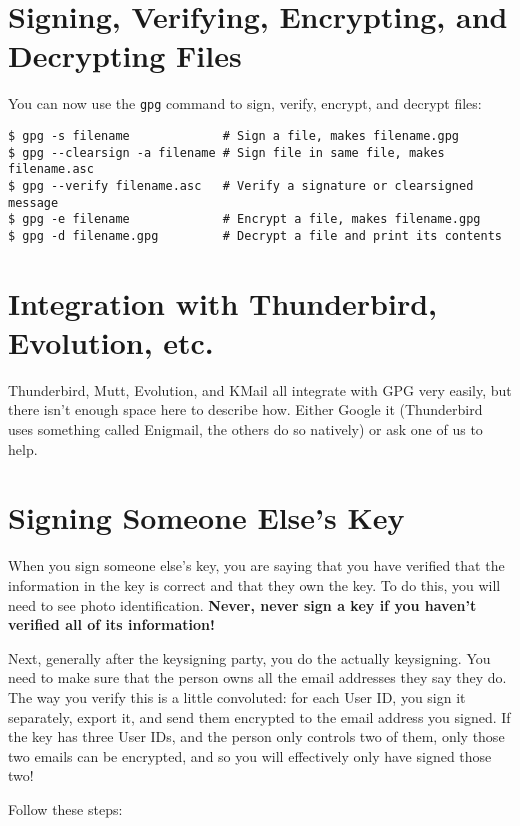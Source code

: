 \documentclass{article}
\begin{document}
\section*{Signing, Verifying, Encrypting, and Decrypting Files}
You can now use the \texttt{gpg} command to sign, verify, encrypt, and
decrypt files:

\begin{lstlisting}
$ gpg -s filename             # Sign a file, makes filename.gpg
$ gpg --clearsign -a filename # Sign file in same file, makes filename.asc
$ gpg --verify filename.asc   # Verify a signature or clearsigned message
$ gpg -e filename             # Encrypt a file, makes filename.gpg
$ gpg -d filename.gpg         # Decrypt a file and print its contents
\end{lstlisting}

\section*{Integration with Thunderbird, Evolution, etc.}
Thunderbird, Mutt, Evolution, and KMail all integrate with GPG very
easily, but there isn't enough space here to describe how.  Either
Google it (Thunderbird uses something called Enigmail, the others do
so natively) or ask one of us to help.

\section*{Signing Someone Else's Key}
When you sign someone else's key, you are saying that you have
verified that the information in the key is correct and that they own
the key.  To do this, you will need to see photo identification.
\textbf{Never, never sign a key if you haven't verified all of its
  information!}

Next, generally after the keysigning party, you do the actually
keysigning.  You need to make sure that the person owns all the email
addresses they say they do.  The way you verify this is a little
convoluted: for each User ID, you sign it separately, export it, and
send them encrypted to the email address you signed.  If the key has
three User IDs, and the person only controls two of them, only those
two emails can be encrypted, and so you will effectively only have
signed those two!

Follow these steps:
\end{document}
